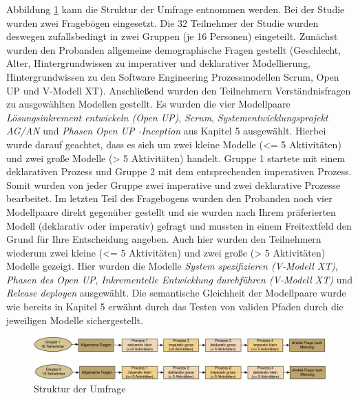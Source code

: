 Abbildung \ref{fig:UmfrageStruktur} kann die Struktur der Umfrage entnommen werden.
Bei der Studie wurden zwei Fragebögen eingesetzt. Die 32 Teilnehmer der Studie wurden deswegen zufallsbedingt in zwei Gruppen (je 16 Personen) eingeteilt. Zunächst wurden den Probanden allgemeine demographische Fragen gestellt (Geschlecht, Alter, Hintergrundwissen zu imperativer und deklarativer Modellierung, Hintergrundwissen zu den Software Engineering Prozessmodellen Scrum, Open UP und V-Modell XT).\newline
Anschließend wurden den Teilnehmern Verständnisfragen zu ausgewählten Modellen gestellt.
Es wurden die vier  Modellpaare \textit{Lösungsinkrement entwickeln (Open UP)}, \textit{Scrum}, \textit{Systementwicklungsprojekt AG/AN} und \textit{Phasen Open UP -Inception}  aus Kapitel 5 ausgewählt. Hierbei wurde darauf geachtet, dass es sich um zwei kleine Modelle (<= 5 Aktivitäten) und zwei große Modelle (> 5 Aktivitäten) handelt. Gruppe 1 startete mit einem deklarativen Prozess und Gruppe 2 mit dem entsprechenden imperativen Prozess. Somit wurden von jeder Gruppe zwei imperative und zwei deklarative Prozesse bearbeitet.  \newline
Im letzten Teil des Fragebogens wurden den Probanden noch vier Modellpaare direkt gegenüber gestellt und sie wurden nach Ihrem präferierten Modell (deklarativ oder imperativ) gefragt und mussten in einem Freitextfeld den Grund für Ihre Entscheidung angeben. Auch hier wurden den Teilnehmern wiederum zwei kleine (<= 5 Aktivitäten) und zwei große (> 5 Aktivitäten)  Modelle gezeigt. Hier wurden die Modelle \textit{System spezifizieren (V-Modell XT)}, \textit{Phasen des Open UP}, \textit{Inkrementelle Entwicklung durchführen (V-Modell XT)} und \textit{Release deployen} ausgewählt. \newline
Die semantische Gleichheit der Modellpaare wurde wie bereits in Kapitel 5 erwähnt durch das Testen von validen Pfaden durch die jeweiligen Modelle sichergestellt.\newline

\begin{figure}[htp]
\begin{center}
  \includegraphics [width=\textwidth]{UmfrageStruktur} %
  \caption{Struktur der Umfrage}
  \label{fig:UmfrageStruktur}
\end{center}
\end{figure}

